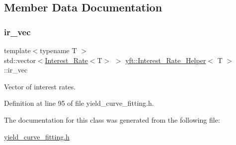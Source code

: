 \subsection{Member Data Documentation}
\mbox{\label{classyft_1_1_interest___rate___helper_aaa22a1a41fd5eead9ea61136ebc8446c}} 
\subsubsection{\texorpdfstring{ir\+\_\+vec}{ir\_vec}}
{\footnotesize\ttfamily template$<$typename T $>$ \\
std\+::vector$<$\hyperlink{structyft_1_1_interest___rate}{Interest\+\_\+\+Rate}$<$T$>$ $>$ \hyperlink{classyft_1_1_interest___rate___helper}{yft\+::\+Interest\+\_\+\+Rate\+\_\+\+Helper}$<$ T $>$\+::ir\+\_\+vec\hspace{0.3cm}{\ttfamily [private]}}



Vector of interest rates. 



Definition at line 95 of file yield\+\_\+curve\+\_\+fitting.\+h.



The documentation for this class was generated from the following file\+:\begin{DoxyCompactItemize}
\item 
\hyperlink{yield__curve__fitting_8h}{yield\+\_\+curve\+\_\+fitting.\+h}\end{DoxyCompactItemize}
